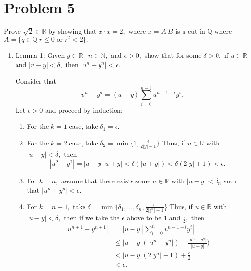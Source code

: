 \documentclass[11pt]{article}
\newcommand{\bbN}{\mathbb{N}}
\newcommand{\bbQ}{\mathbb{Q}}
\newcommand{\bbR}{\mathbb{R}}
\begin{document}
\section*{Problem 5}
\begin{problem}
    Prove $\sqrt{2}\in \bbR$ by showing that $x\cdot x  = 2,$ where $x = A|B$ is a cut in $\bbQ$ where $A = \{q\in\bbQ | r\leq 0 \;\text{or}\; r^2<2\}.$
\end{problem}
\begin{enumerate}
    \item Lemma 1: Given $y\in \bbR,$ $n\in \bbN,$ and $\epsilon>0,$ show that for some $\delta>0,$ if $u\in \bbR$ and $|u-y|<\delta,$ then $|u^n - y^n|<\epsilon.$
    \begin{solution}
    Consider that \[u^n - y^n = (u-y)\sum_{i=0}^{n-1}u^{n-1-i}y^i.\] 
    Let $\epsilon>0$ and proceed by induction:
    \begin{enumerate}
        \item For the $k=1$ case, take $\delta_1 = \epsilon.$
        \item For the $k=2$ case, take $\delta_2 = \min\{1, \frac{\epsilon}{2|y| + 1}\}$ Thus, if $u\in \bbR$ with $|u-y|<\delta,$ then 
        \[|u^2 - y^2| = |u-y||u+y|< \delta(|u + y|)<\delta(2|y| + 1)<\epsilon.\] 
        \item For $k=n,$ assume that there exists some $u\in \bbR$ with $|u-y|<\delta_n$ such that $|u^n - y^n|<\epsilon.$
        
        \item For $k=n+1,$ take $\delta = \min\{\delta_1, \dots, \delta_n, \frac{\epsilon}{2|y^n|+1}\}$ Thus, if $u\in \bbR$ with $|u-y|<\delta,$ then if we take the $\epsilon$ above to be $1$ and $\frac{\epsilon}{2},$ then
        \begin{align*}
            |u^{n+1} - y^{n+1}| &= |u-y|\left|\sum_{i=0}^{n}u^{n-1-i}y^i\right|\\ 
            &\leq |u-y|(|u^n + y^n|) + \frac{|u^n - y^n|}{|u-y|})\\
            &<|u-y|(2|y^n|+1) + \frac{\epsilon}{2}\\
            &<\epsilon.
        \end{align*}
    \end{enumerate}
        

\end{solution}
\end{enumerate}
\end{document}
